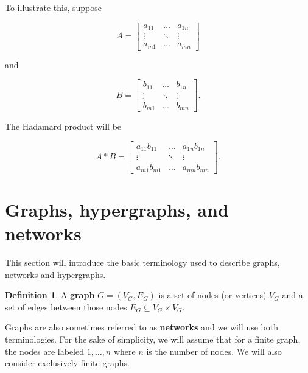 \documentclass{report}
\theoremstyle{definition}
\newtheorem{defin}{Definition}
\theoremstyle{remark}
\begin{document}
To illustrate this, suppose

\begin{equation*}
        A = \begin{bmatrix}
                a_{11} & \dots & a_{1n} \\
                \vdots & \ddots & \vdots \\
                a_{m1} & \dots & a_{mn} 
        \end{bmatrix}
\end{equation*}

and


\begin{equation*}
        B = \begin{bmatrix}
                b_{11} & \dots & b_{1n} \\
                \vdots & \ddots & \vdots \\
                b_{m1} & \dots & b_{mn}
        \end{bmatrix}.
\end{equation*}

The Hadamard product will be

\begin{equation*}
        A \ast B = \begin{bmatrix}
                a_{11}b_{11} & \dots & a_{1n}b_{1n} \\
                \vdots & \ddots & \vdots \\
                a_{m1}b_{m1} & \dots & a_{mn}b_{mn}
        \end{bmatrix}.
\end{equation*}

\section{Graphs, hypergraphs, and networks}

This section will introduce the basic terminology used to describe graphs, networks and hypergraphs.

\begin{defin}
        A \textbf{graph} $G = (V_G,E_G)$ is a set of nodes (or vertices) $V_G$ and a set of edges between those nodes $E_G\subseteq V_G \times V_G$.
\end{defin}

Graphs are also sometimes referred to as \textbf{networks} and we will use both terminologies.
For the sake of simplicity, we will assume that for a finite graph, the nodes are labeled $1,\dots,n$ where $n$ is the number of nodes. We will also consider exclusively finite graphs.
\end{document}
